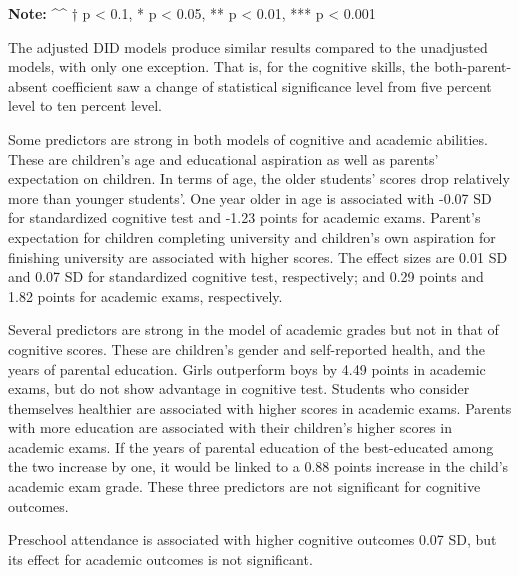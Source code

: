 \documentclass[
  man,floatsintext]{apa7}
\begin{document}
\textbf{Note:}
\^{}\^{} † p \textless{} 0.1, * p \textless{} 0.05, ** p \textless{} 0.01, *** p \textless{} 0.001

The adjusted DID models produce similar results compared to the unadjusted models, with only one exception. That is, for the cognitive skills, the both-parent-absent coefficient saw a change of statistical significance level from five percent level to ten percent level.

Some predictors are strong in both models of cognitive and academic abilities. These are children's age and educational aspiration as well as parents' expectation on children. In terms of age, the older students' scores drop relatively more than younger students'. One year older in age is associated with -0.07 SD for standardized cognitive test and -1.23 points for academic exams. Parent's expectation for children completing university and children's own aspiration for finishing university are associated with higher scores. The effect sizes are 0.01 SD and 0.07 SD for standardized cognitive test, respectively; and 0.29 points and 1.82 points for academic exams, respectively.

Several predictors are strong in the model of academic grades but not in that of cognitive scores. These are children's gender and self-reported health, and the years of parental education. Girls outperform boys by 4.49 points in academic exams, but do not show advantage in cognitive test. Students who consider themselves healthier are associated with higher scores in academic exams. Parents with more education are associated with their children's higher scores in academic exams. If the years of parental education of the best-educated among the two increase by one, it would be linked to a 0.88 points increase in the child's academic exam grade. These three predictors are not significant for cognitive outcomes.

Preschool attendance is associated with higher cognitive outcomes 0.07 SD, but its effect for academic outcomes is not significant.
\end{document}
